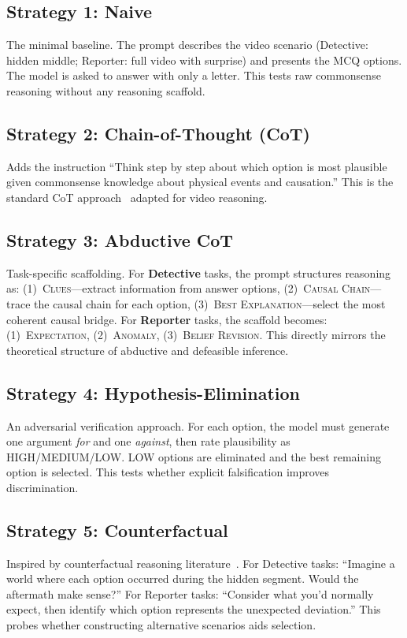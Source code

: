 \documentclass[10pt,twocolumn,letterpaper]{article}
\begin{document}
\subsection{Strategy 1: Naive}
The minimal baseline. The prompt describes the video scenario (Detective: hidden middle; Reporter: full video with surprise) and presents the MCQ options. The model is asked to answer with only a letter. This tests raw commonsense reasoning without any reasoning scaffold.

\subsection{Strategy 2: Chain-of-Thought (CoT)}
Adds the instruction ``Think step by step about which option is most plausible given commonsense knowledge about physical events and causation.'' This is the standard CoT approach~\cite{wei2022chain} adapted for video reasoning.

\subsection{Strategy 3: Abductive CoT}
Task-specific scaffolding. For \textbf{Detective} tasks, the prompt structures reasoning as: (1)~\textsc{Clues}---extract information from answer options, (2)~\textsc{Causal Chain}---trace the causal chain for each option, (3)~\textsc{Best Explanation}---select the most coherent causal bridge. For \textbf{Reporter} tasks, the scaffold becomes: (1)~\textsc{Expectation}, (2)~\textsc{Anomaly}, (3)~\textsc{Belief Revision}. This directly mirrors the theoretical structure of abductive and defeasible inference.

\subsection{Strategy 4: Hypothesis-Elimination}
An adversarial verification approach. For each option, the model must generate one argument \textit{for} and one \textit{against}, then rate plausibility as HIGH/MEDIUM/LOW. LOW options are eliminated and the best remaining option is selected. This tests whether explicit falsification improves discrimination.

\subsection{Strategy 5: Counterfactual}
Inspired by counterfactual reasoning literature~\cite{pearl2009causality}. For Detective tasks: ``Imagine a world where each option occurred during the hidden segment. Would the aftermath make sense?'' For Reporter tasks: ``Consider what you'd normally expect, then identify which option represents the unexpected deviation.'' This probes whether constructing alternative scenarios aids selection.
\end{document}
